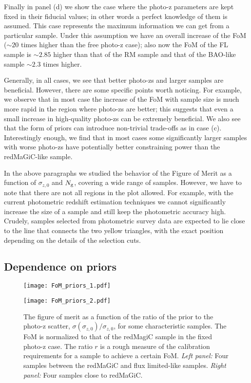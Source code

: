 \documentclass[a4paper,fleqn,usenatbib]{mnras}
\begin{document}
Finally in panel (d) we show the case where the photo-z parameters are kept fixed in their fiducial values; in other words a perfect knowledge of them is assumed. This case represents the maximum information we can get from a particular sample. Under this assumption we have an overall increase of the FoM ($\sim 20$ times higher than the free photo-z case); also now the FoM of the FL sample is $\sim 2.85$ higher than that of the RM sample and that of the BAO-like sample $\sim 2.3$ times higher.

Generally, in all cases, we see that better photo-zs and larger samples are beneficial. However, there are some specific points worth noticing. For example, we observe that in most case the increase of the FoM with sample size is much more rapid in the region where photo-zs are better; this suggests that even a small increase in high-quality photo-zs can be extremely beneficial. We also see that the form of priors can introduce non-trivial trade-offs as in case (c). Interestingly enough, we find that in most cases some significantly larger samples with worse photo-zs have potentially better constraining power than the redMaGiC-like sample.

In the above paragraphs we studied the behavior of the Figure of Merit as a function of $\sigma_{z,0}$ and $N_{\mbox{\scriptsize{g}}}$, covering a wide range of samples. However, we have to note that there are not all regions in the plot allowed. For example, with the current photometric redshift estimation techniques we cannot significantly increase the size of a sample and still keep the photometric accuracy high. Crudely, samples selected from photometric survey data are expected to lie close to the line that connects the two yellow triangles, with the exact position depending on the details of the selection cuts. 


\subsection{Dependence on priors}
\label{subsec: Depend_on_priors}

\begin{figure*}
\centering
\begin{multicols}{2}
\texttt{[image: FoM\_priors\_1.pdf]}\par 
\texttt{[image: FoM\_priors\_2.pdf]}\par 
\end{multicols}
\caption{The figure of merit as a function of the ratio of the prior to the photo-z scatter, $\sigma(\sigma_{z,0})/\sigma_{z,0}$, for some characteristic samples. The FoM is normalized to that of the redMagiC sample in the fixed photo-z case. The ratio $r$ is a rough measure of the calibration requirements for a sample to achieve a certain FoM. \textit{Left panel:} Four samples between the redMaGiC and flux limited-like samples. \textit{Right panel:} Four samples close to redMaGiC.}
\label{fig: Priors_baseline}
\end{figure*}
\end{document}
